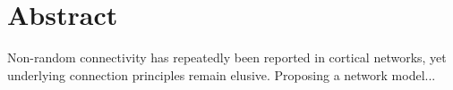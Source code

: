 \begingroup
\let\clearpage\relax
\let\cleardoublepage\relax
\let\cleardoublepage\relax

\chapter*{Abstract}

Non-random connectivity has repeatedly been reported in cortical
networks, yet underlying connection principles remain
elusive. Proposing a network model...





\endgroup			

\vfill

